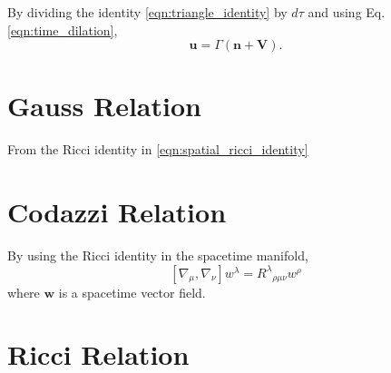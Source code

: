 By dividing the identity \ref{eqn:triangle_identity} by $d\tau$ and using Eq.\ref{eqn:time_dilation},
\begin{equation}
    \mathbf{u}=\Gamma(\mathbf{n}+\mathbf{V}).
    \label{eqn:general_fluid_expression}
\end{equation}



\section{Gauss Relation}
\label{app:gauss}

From the Ricci identity in \cref{eqn:spatial_ricci_identity}



\section{Codazzi Relation}
\label{app:codazzi}


By using the Ricci identity in the spacetime manifold,
\begin{equation}
    \left[\nabla_\mu,\nabla_\nu\right]w^\lambda=R^\lambda{}_{\rho\mu\nu}w^\rho
\end{equation} 
where $\mathbf{w}$ is a spacetime vector field.




\section{Ricci Relation}
\label{app:ricci}



